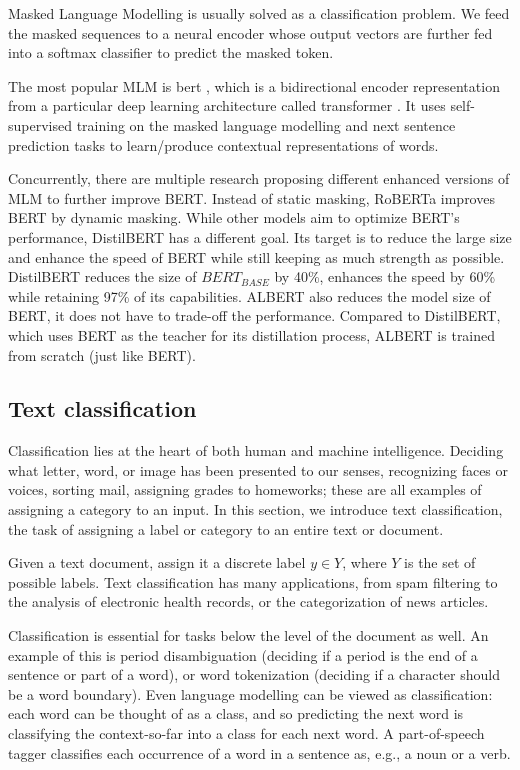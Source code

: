 Masked Language Modelling is usually solved as a classification problem. We feed the masked
sequences to a neural encoder whose output vectors are further fed into a softmax classifier to predict the masked token.

The most popular MLM is \acrshort{bert} \cite{devlin2018bert}, which is a bidirectional encoder representation from a particular deep learning architecture called \gls{transformer} \cite{vaswani2017attention}. 
It uses self-supervised training on the masked language modelling and next sentence prediction tasks to learn/produce contextual representations of words.

Concurrently, there are multiple research proposing different enhanced versions of MLM to further improve BERT. Instead
of static masking, RoBERTa \cite{liu2019roberta} improves BERT by dynamic masking.
While other models aim to optimize BERT's performance, DistilBERT has a different goal. Its target is to reduce the large size and enhance the speed of BERT while still keeping as much strength as possible.
DistilBERT \cite{sanh2019distilbert} reduces the size of $BERT_{BASE}$ by 40\%, enhances the speed by 60\% while retaining 97\% of its capabilities.
ALBERT \cite{lan2019albert} also reduces the model size of BERT, it does not have to trade-off the performance. Compared to DistilBERT, which uses BERT as the teacher for its distillation process, ALBERT is trained from scratch (just like BERT).

\subsection{Text classification}\label{subsec:text-classification}

Classification lies at the heart of both human and machine intelligence. Deciding what letter, word, or image has been presented to our senses, recognizing faces or voices, sorting mail, assigning grades to homeworks; these are all examples of assigning a category to an input.
In this section, we introduce text classification, the task of assigning a label or category to an entire text or document.

Given a text document, assign it a discrete label $y \in Y$, where $Y$ is the set of possible labels. 
Text classification has many applications, from spam filtering to the analysis of electronic health records, or the categorization of news articles.

Classification is essential for tasks below the level of the document as well.
An example of this is period disambiguation (deciding if a period is the end of a sentence or part of a word), or word tokenization (deciding if a character should be a word boundary). Even language modelling can be viewed as classification: each word can be thought of as a class, and so predicting the next word is classifying the context-so-far into a class for each next word. A part-of-speech tagger classifies each occurrence of a word in a sentence as, e.g., a noun or a verb.

